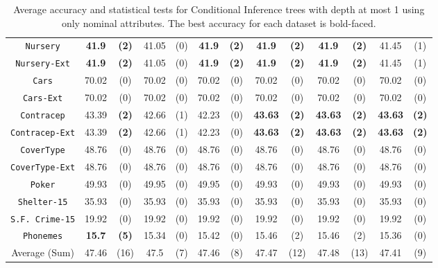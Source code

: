 \begin{table*}
\begin{tabular}{c|cc|cc|cc|cc|cc|cc}
{\tt Nursery}      &{\bf 41.9}  & {\bf (2)} & 41.05       & (0)       & {\bf 41.9}  & {\bf (2)} & {\bf 41.9}  & {\bf (2)} & {\bf 41.9}  & {\bf (2)} & 41.45       & (1)       \\
{\tt Nursery-Ext}  &{\bf 41.9}  & {\bf (2)} & 41.05       & (0)       & {\bf 41.9}  & {\bf (2)} & {\bf 41.9}  & {\bf (2)} & {\bf 41.9}  & {\bf (2)} & 41.45       & (1)       \\
{\tt Cars}         &70.02       & (0)       & 70.02       & (0)       & 70.02       & (0)       & 70.02       & (0)       & 70.02       & (0)       & 70.02       & (0)       \\
{\tt Cars-Ext}     &70.02       & (0)       & 70.02       & (0)       & 70.02       & (0)       & 70.02       & (0)       & 70.02       & (0)       & 70.02       & (0)       \\
{\tt Contracep}    &43.39       & {\bf (2)} & 42.66       & (1)       & 42.23       & (0)       & {\bf 43.63} & {\bf (2)} & {\bf 43.63} & {\bf (2)} & {\bf 43.63} & {\bf (2)} \\
{\tt Contracep-Ext}&43.39       & {\bf (2)} & 42.66       & (1)       & 42.23       & (0)       & {\bf 43.63} & {\bf (2)} & {\bf 43.63} & {\bf (2)} & {\bf 43.63} & {\bf (2)} \\
{\tt CoverType}    &48.76       & (0)       & 48.76       & (0)       & 48.76       & (0)       & 48.76       & (0)       & 48.76       & (0)       & 48.76       & (0)       \\
{\tt CoverType-Ext}&48.76       & (0)       & 48.76       & (0)       & 48.76       & (0)       & 48.76       & (0)       & 48.76       & (0)       & 48.76       & (0)       \\
{\tt Poker}        &49.93       & (0)       & 49.95       & (0)       & 49.95       & (0)       & 49.93       & (0)       & 49.93       & (0)       & 49.93       & (0)       \\  
{\tt Shelter-15}   &35.93       & (0)       & 35.93       & (0)       & 35.93       & (0)       & 35.93       & (0)       & 35.93       & (0)       & 35.93       & (0)       \\   
{\tt S.F. Crime-15}&19.92       & (0)       & 19.92       & (0)       & 19.92       & (0)       & 19.92       & (0)       & 19.92       & (0)       & 19.92       & (0)       \\ 
{\tt Phonemes}     &{\bf 15.7}  & {\bf (5)} & 15.34       & (0)       & 15.42       & (0)       & 15.46       & (2)       & 15.46       & (2)       & 15.36       & (0)       \\ 
\hline
Average (Sum)      & 47.46      & (16)      & 47.5        & (7)       & 47.46       & (8)       & 47.47       & (12)       & 47.48       & (13)      & 47.41      & (9)
\end{tabular}
\caption{Average accuracy and statistical tests  for  Conditional Inference trees with depth at most 1 using only nominal attributes. The best accuracy for each dataset is bold-faced.}
\label{tab:ctree-1}
\end{table*}



